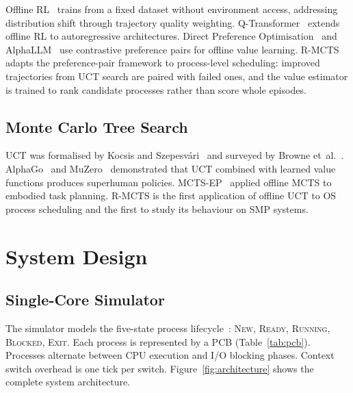 \documentclass[10pt,journal,compsoc]{IEEEtran}
\begin{document}
Offline RL~\cite{levine2020} trains from a fixed dataset without
environment access, addressing distribution shift through trajectory
quality weighting.
Q-Transformer~\cite{qtransformer} extends offline RL to autoregressive
architectures.
Direct Preference Optimisation~\cite{dpo} and AlphaLLM~\cite{alphallm}
use contrastive preference pairs for offline value learning.
R-MCTS adapts the preference-pair framework to process-level scheduling:
improved trajectories from UCT search are paired with failed ones,
and the value estimator is trained to rank candidate processes rather
than score whole episodes.

\subsection{Monte Carlo Tree Search}

UCT was formalised by Kocsis and Szepesv\'{a}ri~\cite{uct} and surveyed
by Browne et~al.~\cite{mcts_survey}.
AlphaGo~\cite{alphago} and MuZero~\cite{muzero} demonstrated that UCT
combined with learned value functions produces superhuman policies.
MCTS-EP~\cite{mctsep} applied offline MCTS to embodied task planning.
R-MCTS is the first application of offline UCT to OS process scheduling
and the first to study its behaviour on SMP systems.

\section{System Design}
\label{sec:design}

\subsection{Single-Core Simulator}

The simulator models the five-state process lifecycle~\cite{stallings}:
\textsc{New}, \textsc{Ready}, \textsc{Running}, \textsc{Blocked},
\textsc{Exit}.
Each process is represented by a PCB (Table~\ref{tab:pcb}).
Processes alternate between CPU execution and I/O blocking phases.
Context switch overhead is one tick per switch.
Figure~\ref{fig:architecture} shows the complete system architecture.
\end{document}
